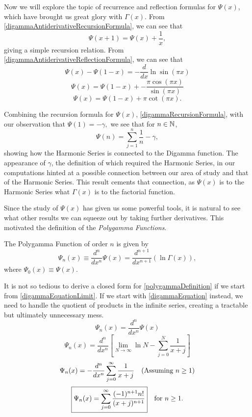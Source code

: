 Now we will explore the topic of recurrence and reflection formulas for $\Psi(x)$, which have brought us great glory with $\Gamma(x)$.
From \eqref{digammaAntiderivativeRecursionFormula}, we can see that
\begin{equation}\label{digammaRecursionFormula}
\boxed{\Psi(x+1) = \Psi(x) + \frac{1}{x}},
\end{equation}
giving a simple recursion relation.
From \eqref{digammaAntiderivativeReflectionFormula}, we can see that
$$\Psi(x) - \Psi(1-x) = -\frac{d}{dx} \ln \sin (\pi x)$$
$$\Psi(x) = \Psi(1-x) + -\frac{\pi \cos (\pi x)}{\sin (\pi x)}$$
\begin{equation}\label{digammaReflectionFormula}
\boxed{\Psi(x) = \Psi(1-x) + \pi \cot (\pi x)}. 
\end{equation}

Combining the recursion formula for $\Psi(x)$, \eqref{digammaRecursionFormula}, with our observation that $\Psi(1) = -\gamma,$ we see that for $n \in \mathbb{N}$,
$$\Psi(n) = \sum_{j=1}^n \frac{1}{n} - \gamma,$$
showing how the Harmonic Series is connected to the Digamma function.
The appearance of $\gamma$, the definition of which required the Harmonic Series, in our computations hinted at a possible connection between our area of study and that of the Harmonic Series.
This result cements that connection, as $\Psi(x)$ is to the Harmonic Series what $\Gamma(x)$ is to the factorial function. 

Since the study of $\Psi(x)$ has given us some powerful tools, it is natural to see what other results we can squeeze out by taking further derivatives.
This motivated the definition of the \textit{Polygamma Functions}.

\begin{defn}
The Polygamma Function of order $n$ is given by 
\begin{equation}\label{polygammaDefinition}
\Psi_n (x) \equiv \frac{d^n}{dx^n} \Psi(x) = \frac{d^{n+1}}{dx^{n+1}} (\ln \Gamma(x)),
\end{equation}
where $\Psi_0 (x) \equiv \Psi(x)$.
\end{defn}

It is not so tedious to derive a closed form for \eqref{polygammaDefinition} if we start from \eqref{digammaEquationLimit}.
If we start with \eqref{digammaEquation} instead, we need to handle the quotient of products in the infinite series, creating a tractable but ultimately unnecessary mess.
$$\Psi_n(x) = \frac{d^n}{dx^n} \Psi(x)$$
$$\Psi_n(x) = \frac{d^n}{dx^n} \left[ \lim_{N \rightarrow \infty} \ln N - \sum_{j=0}^N \frac{1}{x+j} \right]$$
$$\Psi_n(x) = -\frac{d^n}{dx^n} \sum_{j=0}^\infty \frac{1}{x+j} \hspace{10px} (\text{Assuming $n \geq 1$})$$
\begin{equation}\label{polygammaEquation}
\boxed{\Psi_n(x) = \sum_{j=0}^\infty \frac{(-1)^{n+1} n!}{(x+j)^{n+1}}} \hspace{10px} \text{for $n \geq 1$}.
\end{equation}


